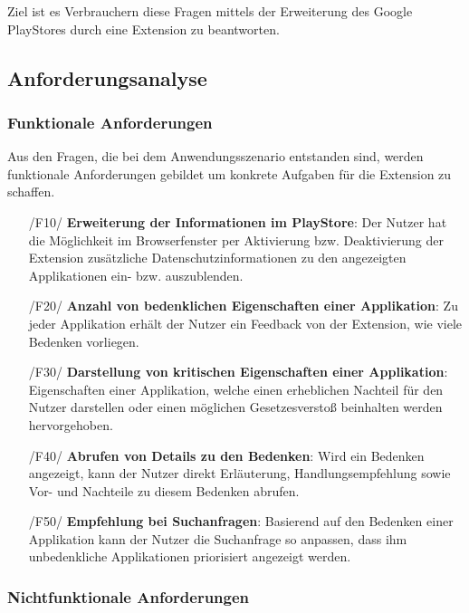 Ziel ist es Verbrauchern diese Fragen mittels der Erweiterung des Google PlayStores durch eine Extension zu beantworten.

\subsection{Anforderungsanalyse}
\label{ss:anforderungsanalyse}

\subsubsection{Funktionale Anforderungen}
\label{sss:funktionaleanforderungen}
Aus den Fragen, die bei dem Anwendungsszenario entstanden sind, werden funktionale Anforderungen gebildet um konkrete Aufgaben für die Extension zu schaffen. %

\begin{itemize}
	\item[/F10/] \textbf{Erweiterung der Informationen im PlayStore}:
	Der Nutzer hat die Möglichkeit im Browserfenster per Aktivierung bzw. Deaktivierung der Extension zusätzliche Datenschutzinformationen zu den angezeigten Applikationen ein- bzw. auszublenden.
	
	\item[/F20/] \textbf{Anzahl von bedenklichen Eigenschaften einer Applikation}:
	Zu jeder Applikation erhält der Nutzer ein Feedback von der Extension, wie viele Bedenken vorliegen.
	
	\item[/F30/] \textbf{Darstellung von kritischen Eigenschaften einer Applikation}:
	Eigenschaften einer Applikation, welche einen erheblichen Nachteil für den Nutzer darstellen oder einen möglichen Gesetzesverstoß beinhalten werden hervorgehoben.
	
	\item[/F40/] \textbf{Abrufen von Details zu den Bedenken}:
	Wird ein Bedenken angezeigt, kann der Nutzer direkt Erläuterung, Handlungsempfehlung sowie Vor- und Nachteile zu diesem Bedenken abrufen.
	
	\item[/F50/] \textbf{Empfehlung bei Suchanfragen}:
	Basierend auf den Bedenken einer Applikation kann der Nutzer die Suchanfrage so anpassen, dass ihm unbedenkliche Applikationen priorisiert angezeigt werden.
\end{itemize}

\subsubsection{Nichtfunktionale Anforderungen}

